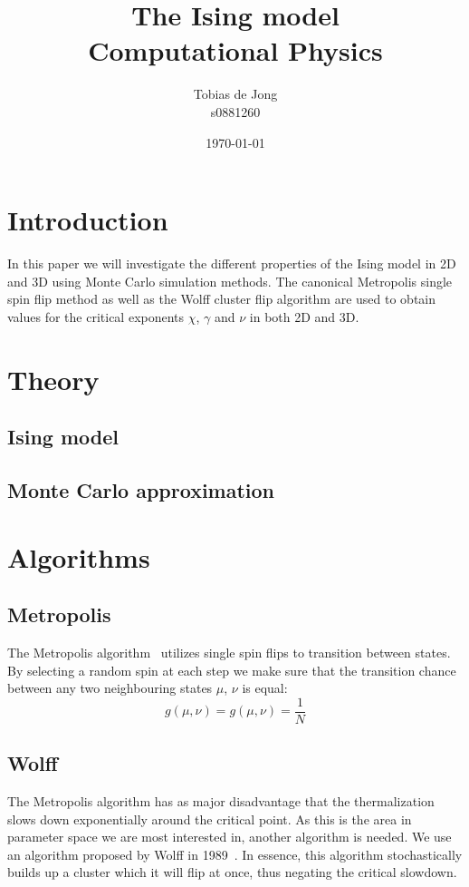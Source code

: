 \documentclass[11pt,twocolumn]{article}
\begin{document}
\title{The Ising model\\ {\large Computational Physics}}
\author{Tobias de Jong\\ s0881260}
\date{\today} %

\maketitle
\newcommand{\Part}[3][ ]{\ensuremath{\frac{\partial^{#1} #2}{{\partial #3}^{#1}}}}
\newcommand{\Dif}[3][ ]{\ensuremath{\frac{d^{#1} #2}{{d #3}^{#1}}}}
\renewcommand{\O}[1]{\ensuremath{\mathcal{O}\left(#1\right)}}
\renewcommand{\vec}{\bold}
\section{Introduction}
In this paper we will investigate the different properties of the Ising model in 2D and 3D using Monte Carlo simulation methods. The canonical Metropolis single spin flip method as well as the Wolff cluster flip algorithm are used to obtain values for the critical exponents $\chi$, $\gamma$ and $\nu$ in both 2D and 3D. %
\section{Theory}
\subsection{Ising model}
\subsection{Monte Carlo approximation}
\section{Algorithms}
\subsection{Metropolis}
The Metropolis algorithm~\cite{Metropolis} utilizes single spin flips to transition between states. By selecting a random spin at each step we make sure that the transition chance  between any two neighbouring states $\mu$, $\nu$ is equal:
\[g(\mu,\nu) = g(\mu,\nu) = \frac1N\]
\subsection{Wolff}
The Metropolis algorithm has as major disadvantage that the thermalization slows down exponentially around the critical point. As this is the area in parameter space we are most interested in, another algorithm is needed. We use an algorithm proposed by Wolff in 1989~\cite{Wolff}. In essence, this algorithm stochastically builds up a cluster which it will flip at once, thus negating the critical slowdown.
\end{document}

